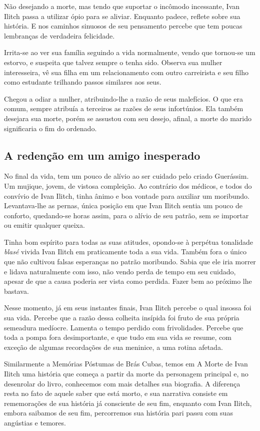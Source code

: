 \documentclass[12pt]{extarticle}
\begin{document}
Não desejando a morte, mas tendo que suportar o incômodo incessante,
Ivan Ilitch passa a utilizar ópio para se aliviar. Enquanto padece,
reflete sobre sua história. E nos caminhos sinuosos de seu pensamento
percebe que tem poucas lembranças de verdadeira felicidade.

Irrita-se ao ver sua família seguindo a vida normalmente, vendo que
tornou-se um estorvo, e suspeita que talvez sempre o tenha sido. Observa
sua mulher interesseira, vê sua filha em um relacionamento com outro
carreirista e seu filho como estudante trilhando passos similares aos
seus.

Chegou a odiar a mulher, atribuindo-lhe a razão de seus malefícios. O
que era comum, sempre atribuía a terceiros as razões de seus
infortúnios. Ela também desejara sua morte, porém se assustou com seu
desejo, afinal, a morte do marido significaria o fim do ordenado.

\subsection{A redenção em um amigo inesperado}

No final da vida, tem um pouco de alívio ao ser cuidado pelo criado
Guerássim. Um mujique, jovem, de vistosa compleição. Ao contrário dos
médicos, e todos do convívio de Ivan Ilitch, tinha ânimo e boa vontade
para auxiliar um moribundo. Levantava-lhe as pernas, única posição em
que Ivan Ilitch sentia um pouco de conforto, quedando-se horas assim,
para o alívio de seu patrão, sem se importar ou emitir qualquer queixa.

Tinha bom espírito para todas as suas atitudes, opondo-se à perpétua
tonalidade \emph{blasé} vivida Ivan Ilitch em praticamente toda a sua
vida. Também fora o único que não cultivou falsas esperanças no patrão
moribundo. Sabia que ele iria morrer e lidava naturalmente com isso, não
vendo perda de tempo em seu cuidado, apesar de que a causa poderia ser
vista como perdida. Fazer bem ao próximo lhe bastava.

Nesse momento, já em seus instantes finais, Ivan Ilitch percebe o qual
insossa foi sua vida. Percebe que a razão dessa colheita insípida foi
fruto de sua própria semeadura medíocre. Lamenta o tempo perdido com
frivolidades. Percebe que toda a pompa fora desimportante, e que tudo em
sua vida se resume, com exceção de algumas recordações de sua meninice,
a uma rotina afetada.

Similarmente a Memórias Póstumas de Brás Cubas, temos em A Morte de Ivan
Ilitch uma história que começa a partir da morte da personagem principal
e, no desenrolar do livro, conhecemos com mais detalhes sua biografia. A
diferença resta no fato de aquele saber que está morto, e sua narrativa
consiste em rememorações de sua história já consciente de seu fim,
enquanto com Ivan Ilitch, embora saibamos de seu fim, percorremos sua
história pari passu com suas angústias e temores.
\end{document}

